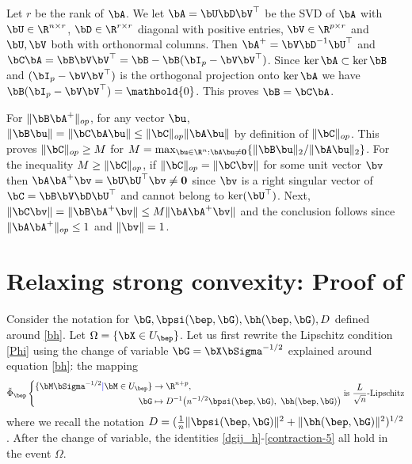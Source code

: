 \documentclass{colt2022} %
\newcommand{\ysc}[1]{{\color{blue} #1}}
\renewenvironment{proof}[1][]
{
    \begin{newproof}
    \ifthenelse{\equal{#1}{}}{ }{\textbf{(#1) }}%
}{
    \end{newproof}
}
\numberwithin{equation}{section}
\begin{document}
\begin{proof}
    Let $r$ be the rank of $\bA$.
    We let 
    $
        \bA = \bU \bD \bV^{\top}
    $
    be the SVD of $\bA$
    with $\bU\in\R^{n\times r}$,
    $\bD\in\R^{r\times r}$ diagonal with positive entries, 
    $\bV \in\R^{p\times r}$ and
    $\bU,\bV$ both with orthonormal columns.
    Then $\bA^+ = \bV\bD^{-1}\bU^\top$ and $\bC \bA = \bB\bV\bV^\top=\bB - \bB(\bI_p-\bV\bV^\top)$. Since $\ker \bA \subset \ker \bB$
    and $(\bI_p-\bV\bV^\top)$ is the orthogonal projection onto $\ker \bA$
    we have
    $\bB(\bI_p-\bV\bV^\top)=\mathbold{0}$. This proves $\bB=\bC\bA$.

    For $\|\bB\bA^+\|_{op}$,
    for any vector $\bu$,
    $\|\bB \bu\| = \|\bC\bA \bu\|
    \le \|\bC\|_{op} \|\bA\bu\|$ by definition of $\|\bC\|_{op}$.
    This proves
    $\| \bC \|_{op} \ge M$
    for $M=\max_{\bu \in \R^{n}:\bA\bu\ne \mathbf0} \{ \| \bB \bu \|_{2} / \| \bA \bu \|_{2} \}$.
    For the inequality $M\ge \|\bC\|_{op}$, if $\|\bC\|_{op} = \|\bC\bv\|$
    for some unit vector $\bv$ then $\bA\bA^+\bv = \bU\bU^\top\bv \ne \mathbf0$
    since $\bv$ is a right singular vector of $\bC=\bB\bV\bD\bU^\top$ and
    cannot belong to $\ker(\bU^\top)$. Next,
    $\|\bC\bv\| = \|\bB\bA^+\bv\|
    \le 
    M
    \|\bA\bA^+\bv\|
    $
    and the conclusion follows since $\|\bA\bA^+\|_{op}\le 1$
    and $\|\bv\|=1$.
\end{proof}

\section{Relaxing strong convexity: Proof of }
\label{appendix:proof-prop12}
Consider the notation for $\bG, \bpsi(\bep,\bG),\bh(\bep,\bG),D$ defined around \eqref{bh}.
Let $\Omega=\{\bX\in U_{\bep}\}$.
Let us first rewrite the Lipschitz condition \eqref{Phi}
using the change of variable $\bG=\bX\bSigma^{-1/2}$ explained around
equation \eqref{bh}:
the mapping
$$
\tilde\Phi_{\bep}
    \left\{
\begin{aligned}
    \{\bM\bSigma^{-1/2} \ysc{\mid} \bM\in U_{\bep} \} &\to \R^{n+p}, \qquad
        \\ \bG &\mapsto 
            D^{-1}
            \bigl(
                n^{-1/2}\bpsi(\bep,\bG), ~
                \bh(\bep,\bG)
            \bigr)
\end{aligned}
\right.
\text{is $\frac{L}{\sqrt n}$-Lipschitz}
$$
where we recall the notation
$D=(\frac1n \|\bpsi(\bep,\bG)\|^2
+ \|\bh(\bep,\bG)\|^2
)^{1/2}$.
After the change of variable, the identities
\eqref{dgij_h}-\eqref{contraction-5} all hold in the event $\Omega$.
\end{document}
